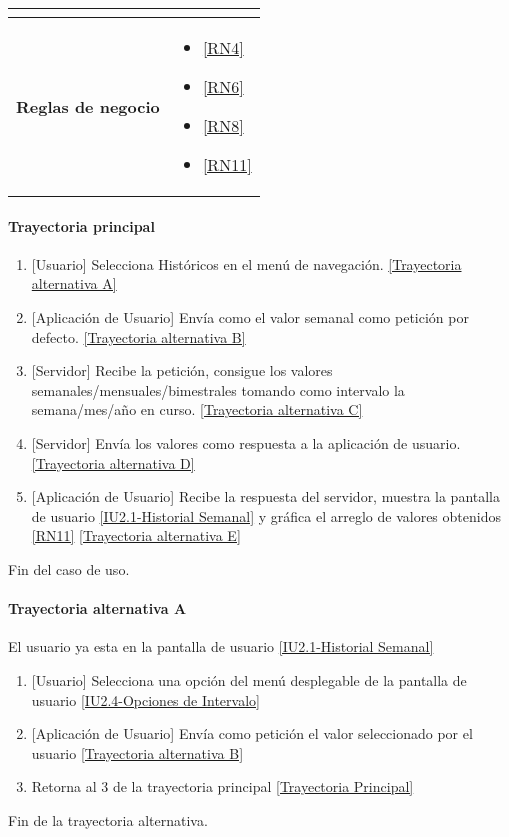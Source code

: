 \begin{longtable}{|J{5cm}|J{10.3cm}|}
\begin{itemize}
		\end{itemize} \\ \hline
	\textbf{Reglas de negocio} & 
		\begin{itemize}
		    \item \ref{RN4}
		    \item \ref{RN6}
			\item \ref{RN8}
			\item \ref{RN11}
		\end{itemize} \\ \hline

\end{longtable}

\paragraph{Trayectoria principal}
    \label{SUB-M-CU1.5:TP}
	\begin{enumerate}
	    \item {[Usuario]} Selecciona Históricos en el menú de navegación. \hyperref[SUB-U-CU1.6:TA]{[Trayectoria alternativa A]} 
		\item {[Aplicación de Usuario]} Envía como el valor semanal como petición por defecto. \hyperref[SUB-U-CU1.6:TB]{[Trayectoria alternativa B]} 
		\item {[Servidor]} Recibe la petición, consigue los valores semanales/mensuales/bimestrales tomando como intervalo la semana/mes/año en curso. \hyperref[SUB-U-CU1.6:TC]{[Trayectoria alternativa C]} 
		\item {[Servidor]} Envía los valores como respuesta a la aplicación de usuario. \hyperref[SUB-U-CU1.6:TD]{[Trayectoria alternativa D]}
        \item {[Aplicación de Usuario]} Recibe la respuesta del servidor, muestra la pantalla de usuario \hyperref[fig:Historial Semanal]{[IU2.1-Historial Semanal]} y gráfica el arreglo de valores obtenidos \ref{RN11} \hyperref[SUB-U-CU1.6:TE]{[Trayectoria alternativa E]}
	\end{enumerate}
	Fin del caso de uso.

\paragraph{Trayectoria alternativa A} \label{SUB-U-CU1.6:TA}
    El usuario ya esta en la pantalla de usuario \hyperref[fig:Historial Semanal]{[IU2.1-Historial Semanal]}
	\begin{enumerate}[label=A\arabic*.]
	    \item {[Usuario]} Selecciona una opción del menú desplegable de la pantalla de usuario \hyperref[fig:Opciones de Intervalo]{[IU2.4-Opciones de Intervalo]}
	    \item {[Aplicación de Usuario]} Envía como petición el valor seleccionado por el usuario \hyperref[SUB-U-CU1.6:TB]{[Trayectoria alternativa B]} 
	    \item Retorna al 3 de la trayectoria principal \hyperref[SUB-U-CU1.6:TP]{[Trayectoria Principal]}
	\end{enumerate}
	Fin de la trayectoria alternativa.
	

